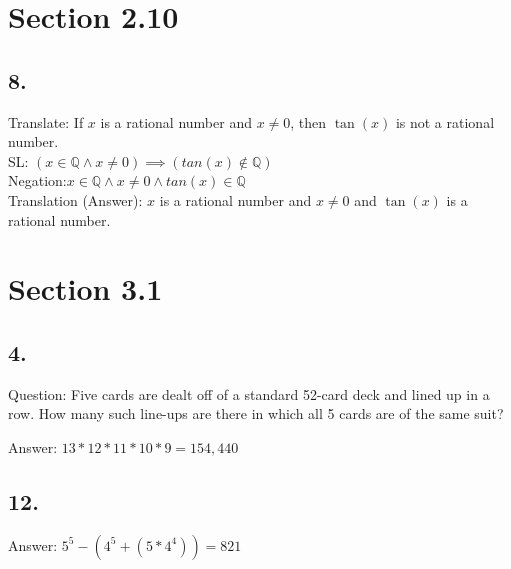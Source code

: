 \documentclass[12pt]{article}
\begin{document}
\hfill\vline\hfill
\begin{minipage}[t]{0.45\textwidth}

\section*{Section 2.10}
\subsection*{8.}
Translate: If $ x $ is a rational number and $ x \neq 0 $, then $ \tan(x) $ is not a rational number.\\

SL: $ (x\in \mathbb{Q} \land x\neq 0)  \implies (tan(x) \notin \mathbb{Q})$ \\
Negation:$ x\in \mathbb{Q} \land x\neq 0 \land tan(x) \in \mathbb{Q}$ \\

Translation (Answer):  $ x $ is a rational number and $ x \neq 0 $ and $ \tan(x) $ is a rational number.



\section*{Section 3.1}
\subsection*{4.}
Question: Five cards are dealt off of a standard 52-card deck and lined up in a row. How
many such line-ups are there in which all 5 cards are of the same suit?

Answer: $ 13*12*11*10*9 = 154,440 $
\subsection*{12.}
Answer: $ 5^5-(4^5+(5*4^4))=821$

\end{minipage}
\pagebreak
\end{document}
